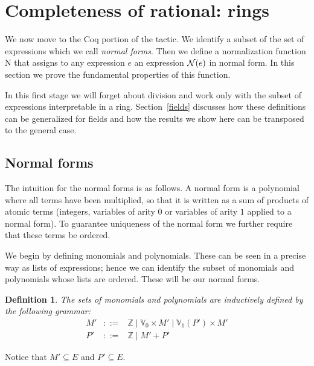 \documentclass{article}
\newtheorem{definition}{Definition}[section]
\newcommand{\N}{{\cal N}}
\newcommand{\alt}{\mathrel{|}}
\newcommand{\Z}{{\mathbb Z}}
\newcommand{\V}{{\mathbb V}}
\newcommand{\tacticname}[1]{\textsf{#1}}
\newcommand{\rational}{\tacticname{rational}}
\begin{document}
\section{Completeness of {\rational}: rings}\label{normalization}

We now move to the Coq portion of the tactic.
We identify a subset of the set of expressions which we call
\emph{normal forms}.  Then we define a normalization function {\N}
that assigns to any expression $e$ an expression $\N(e)$ in normal
form.  In this section we prove the fundamental properties of this function.

In this first stage we will forget about division and work only with
the subset of expressions interpretable in a ring.
Section~\ref{fields} discusses how these definitions can be
generalized for fields and how the results we show here can be
transposed to the general case.

\subsection{Normal forms}

The intuition for the normal forms is as follows.  A normal form is a
polynomial where all terms have been multiplied, so that it is written
as a sum of products of atomic terms (integers, variables of arity $0$ or
variables of arity $1$ applied to a normal form).  To guarantee uniqueness
of the normal form we further require that these terms be ordered.

We begin by defining monomials and polynomials.  These can be seen in
a precise way as lists of expressions; hence we can identify the
subset of monomials and polynomials whose lists are ordered.  These
will be our normal forms.

\begin{definition}\label{def:prenf}
The sets of \emph{monomials} and \emph{polynomials} are inductively
defined by the following grammar:
\begin{eqnarray*}
M' & ::= & \Z \alt \V_0\times M' \alt \V_1(P')\times M' \\
P' & ::= & \Z \alt M'+P'
\end{eqnarray*}
\end{definition}
Notice that $M'\subseteq E$ and $P'\subseteq E$.
\end{document}
